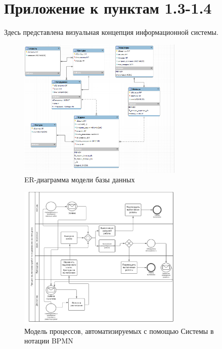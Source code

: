 \section{Приложение к пунктам 1.3-1.4}

Здесь представлена визуальная концепция информационной системы.

\begin{figure}[h]
\centering
\includegraphics[width=0.7\textwidth]{Images/model.png}
\caption{ER-диаграмма модели базы данных}
\end{figure}

\newpage


\begin{figure}[h]
\centering
\includegraphics[width=0.7\textwidth]{Images/process.png}
\caption{Модель процессов, автоматизируемых с помощью Системы в нотации BPMN}
\end{figure}

\newpage

